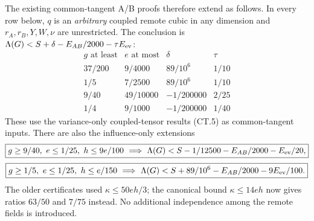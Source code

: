 The existing common-tangent A/B proofs therefore extend as follows.
In every row below, $q$ is an \emph{arbitrary} coupled remote cubic
in any dimension and $r_A,r_B,Y,W,\nu$ are unrestricted. The
conclusion is $\Lambda(G)<S+\delta-E_{AB}/2000-\tau E_{\rm ev}$:
\[
\begin{array}{c|c|c|c}
g\text{ at least}& e\text{ at most}&\delta&\tau\\\hline
37/200&9/4000&89/10^6&1/10\\
1/5&7/2500&89/10^6&1/10\\
9/40&49/10000&-1/200000&2/25\\
1/4&9/1000&-1/200000&1/40
\end{array}
\]
These use the variance-only coupled-tensor results (CT.5) as
common-tangent inputs. There are also the influence-only extensions
\[
 \boxed{g\ge9/40,\ e\le1/25,\ h\le9e/100
 \ \Longrightarrow\
 \Lambda(G)<S-1/12500-E_{AB}/2000-E_{\rm ev}/20,}
\]
\[
 \boxed{g\ge1/5,\ e\le1/25,\ h\le e/150
 \ \Longrightarrow\
 \Lambda(G)<S+89/10^6-E_{AB}/2000-9E_{\rm ev}/100.}
\]
The older certificates used $\kappa\le50eh/3$; the canonical bound
$\kappa\le14eh$ now gives ratios $63/50$ and $7/75$ instead.
No additional independence among the remote fields is introduced.

